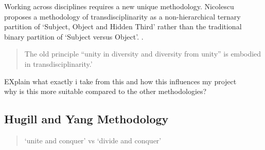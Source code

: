 Working across disciplines requires a new unique methodology. Nicolescu proposes a methodology of transdisciplinarity as a non-hierarchical ternary partition of `Subject, Object and Hidden Third' rather than the traditional binary partition of `Subject versus Object'. \autocite{Nicolescu2010}.


\begin{quotation}
  The old principle ``unity in diversity and diversity from unity'' is embodied in transdisciplinarity.' 
\end{quotation}

\begin{draft}
  EXplain what exactly i take from this and how this influences my project\\
  why is this more suitable compared to the other methodologies?
\end{draft}

\subsection{Hugill and Yang Methodology}

\begin{quotation}
  `unite and conquer' vs `divide and conquer' 
\end{quotation}

